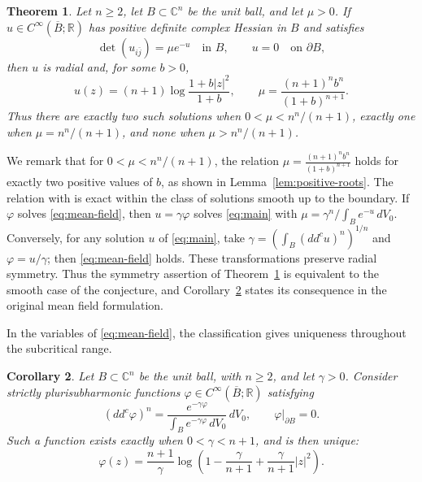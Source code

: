\documentclass[11pt]{article}
\newtheorem{theorem}{Theorem}[section]
\newtheorem{corollary}[theorem]{Corollary}
\newcommand{\C}{\mathbb C}
\newcommand{\R}{\mathbb R}
\begin{document}
\begin{theorem}\label{thm:main}
Let $n\ge2$, let $B\subset\C^n$ be the unit ball, and let $\mu>0$.
If $u\in C^\infty(\overline B;\R)$ has positive definite complex Hessian
in $B$ and satisfies
$$
 \det(u_{i\bar j})=\mu e^{-u}\quad\text{in }B,
 \qquad u=0\quad\text{on }\partial B,
$$
then $u$ is radial and, for some $b>0$,
\begin{equation}\label{eq:radial}
 u(z)=(n+1)\log\frac{1+b|z|^2}{1+b},
 \qquad
 \mu=\frac{(n+1)^n b^n}{(1+b)^{n+1}}.
\end{equation}
Thus there are exactly two such solutions when
$0<\mu<n^n/(n+1)$, exactly one when $\mu=n^n/(n+1)$, and none when
$\mu>n^n/(n+1)$.
\end{theorem}

We remark that for $0<\mu<n^n/(n+1)$, the relation
$\mu=\frac{(n+1)^n b^n}{(1+b)^{n+1}}$ holds for exactly two positive
values of $b$, as shown in Lemma~\ref{lem:positive-roots}. The relation with  \cite[Conjecture~7.6]{BB2022} is exact within the class of
solutions smooth up to the boundary. If $\varphi$ solves
\eqref{eq:mean-field}, then $u=\gamma\varphi$ solves
\eqref{eq:main} with
$\mu=\gamma^n/\int_Be^{-u}\,dV_0$. Conversely, for any solution
$u$ of \eqref{eq:main}, take
$\gamma=(\int_B(dd^cu)^n)^{1/n}$ and $\varphi=u/\gamma$;
then \eqref{eq:mean-field} holds. These transformations preserve
radial symmetry. Thus the symmetry assertion of
Theorem~\ref{thm:main} is equivalent to the smooth case of the
conjecture, and Corollary~\ref{cor:mean-field} states its
consequence in the original mean field formulation.

In the variables of \eqref{eq:mean-field}, the classification gives
uniqueness throughout the subcritical range.


\begin{corollary}\label{cor:mean-field}
Let $B\subset\C^n$ be the unit ball, with $n\ge2$, and let
$\gamma>0$. Consider strictly
plurisubharmonic functions
$\varphi\in C^\infty(\overline B;\R)$ satisfying
$$
 (dd^c\varphi)^n
 =\frac{e^{-\gamma\varphi}}{\int_Be^{-\gamma\varphi}\,dV_0}\,dV_0,
 \qquad \varphi|_{\partial B}=0.
$$
Such a function exists exactly when $0<\gamma<n+1$, and is then unique:
$$
 \varphi(z)=\frac{n+1}{\gamma}
   \log\left(1-\frac\gamma{n+1}
                  +\frac\gamma{n+1}|z|^2\right).
$$
\end{corollary}

\end{document}
